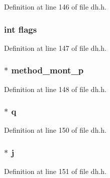 Definition at line 146 of file dh.\+h.

\subsubsection[{\texorpdfstring{flags}{flags}}]{\setlength{\rightskip}{0pt plus 5cm}int flags}\hypertarget{structdh__st_ac8bf36fe0577cba66bccda3a6f7e80a4}{}\label{structdh__st_ac8bf36fe0577cba66bccda3a6f7e80a4}


Definition at line 147 of file dh.\+h.

\subsubsection[{\texorpdfstring{method\+\_\+mont\+\_\+p}{method_mont_p}}]{ $\ast$ method\+\_\+mont\+\_\+p}\hypertarget{structdh__st_aca596b8cfa4cbd8719edf7a5d1f4cb62}{}\label{structdh__st_aca596b8cfa4cbd8719edf7a5d1f4cb62}


Definition at line 148 of file dh.\+h.

\subsubsection[{\texorpdfstring{q}{q}}]{ $\ast$ q}\hypertarget{structdh__st_aa8aedc93a12df9d36c9fe616c2b6486a}{}\label{structdh__st_aa8aedc93a12df9d36c9fe616c2b6486a}


Definition at line 150 of file dh.\+h.

\subsubsection[{\texorpdfstring{j}{j}}]{ $\ast$ j}\hypertarget{structdh__st_a953fef8d0ad85d2258873133fd62cc68}{}\label{structdh__st_a953fef8d0ad85d2258873133fd62cc68}


Definition at line 151 of file dh.\+h.

